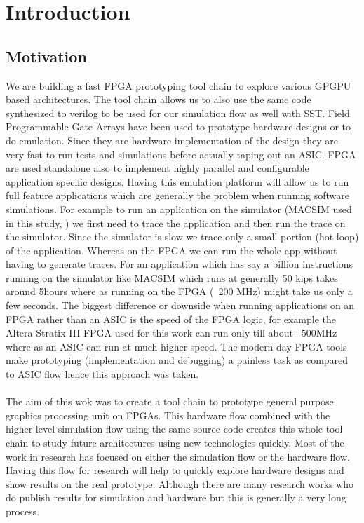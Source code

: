 \setcounter{equation}{0}

\chapter{Introduction}
\label{chap:introduction}

\section{Motivation}
We are building a fast FPGA prototyping tool chain to explore various GPGPU based architectures. The tool chain allows us to also use the same code synthesized to verilog to be used for our simulation flow as well with SST.
Field Programmable Gate Arrays have been used to prototype hardware designs or to do emulation. Since they are hardware implementation of the design they are very fast to run tests and simulations before actually taping out an ASIC. FPGA are used standalone also to implement highly parallel and configurable application specific designs. Having this emulation platform will allow us to run full feature applications which are generally the problem when running software simulations. For example to run an application on the simulator (MACSIM used in this study, \cite{schreier}) we first need to trace the application and then run the trace on the simulator. Since the simulator is slow we trace only a small portion (hot loop) of the application. Whereas on the FPGA we can run the whole app without having to generate traces. For an application which has say a billion instructions running on the simulator like MACSIM which runs at generally 50 kips takes around 5hours where as running on the FPGA (~200 MHz) might take us only a few seconds. The biggest difference or downside when running applications on an FPGA rather than an ASIC is the speed of the FPGA logic, for example the Altera Stratix III FPGA used for this work can run only till about ~500MHz where as an ASIC can run at much higher speed. The modern day FPGA tools make prototyping (implementation and debugging) a painless task as compared to ASIC flow hence this approach was taken.\\
\\
The aim of this wok was to create a tool chain to prototype general purpose graphics processing unit on FPGAs. This hardware flow combined with the higher level simulation flow using the same source code creates this whole tool chain to study future architectures using new technologies quickly. Most of the work in research has focused on either the simulation flow or the hardware flow. Having this flow for research will help to quickly explore hardware designs and show results on the real prototype. Although there are many research works who do publish results for simulation and hardware but this is generally a very long process.

